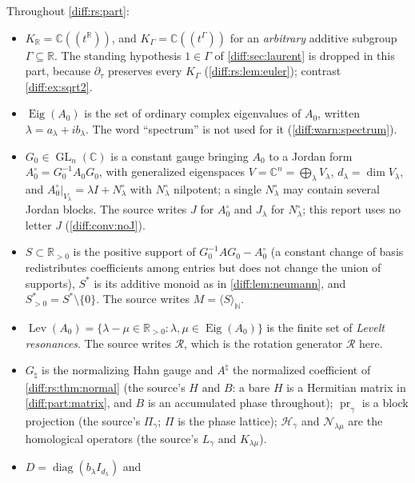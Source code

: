 \documentclass[11pt,letterpaper]{article}
\numberwithin{equation}{section}
\theoremstyle{definition}
\theoremstyle{remark}
\newcommand{\R}{\mathbb R}
\newcommand{\C}{\mathbb C}
\newcommand{\N}{\mathbb N}
\newcommand{\der}{\partial}
\newcommand{\GL}{\operatorname{GL}}
\newcommand{\Rot}{\mathcal R}
\newcommand{\derT}{\der_{\tau}}
\newcommand{\KR}{K_{\R}}
\newcommand{\Eig}{\operatorname{Eig}}
\newcommand{\Lev}{\operatorname{Lev}}
\newcommand{\pr}{\operatorname{pr}}
\begin{document}
\begin{convention}
\label{diff:rs:conv:alphabet}
Throughout \cref{diff:rs:part}:
\begin{itemize}[leftmargin=1.6em]
\item $\KR=\C((t^{\R}))$, and $K_{\Gamma}=\C((t^{\Gamma}))$ for an
\emph{arbitrary} additive subgroup $\Gamma\subseteq\R$. The standing
hypothesis $1\in\Gamma$ of \cref{diff:sec:laurent} is dropped in this part,
because $\derT$ preserves every $K_{\Gamma}$ (\cref{diff:rs:lem:euler});
contrast \cref{diff:ex:sqrt2}.
\item $\Eig(A_{0})$ is the set of ordinary complex eigenvalues of $A_{0}$,
written $\lambda=a_{\lambda}+ib_{\lambda}$. The word ``spectrum'' is not used
for it (\cref{diff:warn:spectrum}).
\item $G_{0}\in\GL_{n}(\C)$ is a constant gauge bringing $A_{0}$ to a Jordan
form $A_{0}^{\circ}=G_{0}^{-1}A_{0}G_{0}$, with generalized eigenspaces
$V=\C^{n}=\bigoplus_{\lambda}V_{\lambda}$, $d_{\lambda}=\dim V_{\lambda}$, and
$A_{0}^{\circ}|_{V_{\lambda}}=\lambda I+N^{\circ}_{\lambda}$ with
$N^{\circ}_{\lambda}$ nilpotent; a single $N^{\circ}_{\lambda}$ may contain
several Jordan blocks. The source writes $J$ for $A_{0}^{\circ}$ and
$J_{\lambda}$ for $N^{\circ}_{\lambda}$; this report uses no letter $J$
(\cref{diff:conv:noJ}).
\item $S\subset\R_{>0}$ is the positive support of $G_{0}^{-1}AG_{0}-A_{0}^{\circ}$
(a constant change of basis redistributes coefficients among entries but does
not change the union of supports), $S^{*}$ is its additive monoid as in
\cref{diff:lem:neumann}, and $S^{*}_{>0}=S^{*}\setminus\{0\}$. The source
writes $M=\langle S\rangle_{\N}$.
\item $\Lev(A_{0})=\{\lambda-\mu\in\R_{>0}:\lambda,\mu\in\Eig(A_{0})\}$ is the
finite set of \emph{Levelt resonances}. The source writes $\mathcal R$, which is
the rotation generator $\Rot$ here.
\item $G_{\natural}$ is the normalizing Hahn gauge and $A^{\natural}$ the
normalized coefficient of \cref{diff:rs:thm:normal} (the source's $H$ and $B$:
a bare $H$ is a Hermitian matrix in \cref{diff:part:matrix}, and $B$ is an
accumulated phase throughout); $\pr_{\gamma}$ is a block projection (the
source's $\Pi_{\gamma}$; $\Pi$ is the phase lattice); $\mathcal H_{\gamma}$ and
$\mathcal N_{\lambda\mu}$ are the homological operators (the source's
$L_{\gamma}$ and $K_{\lambda\mu}$).
\item $D=\operatorname{diag}(b_{\lambda}I_{d_{\lambda}})$ and

\end{itemize}
\end{convention}
\end{document}
